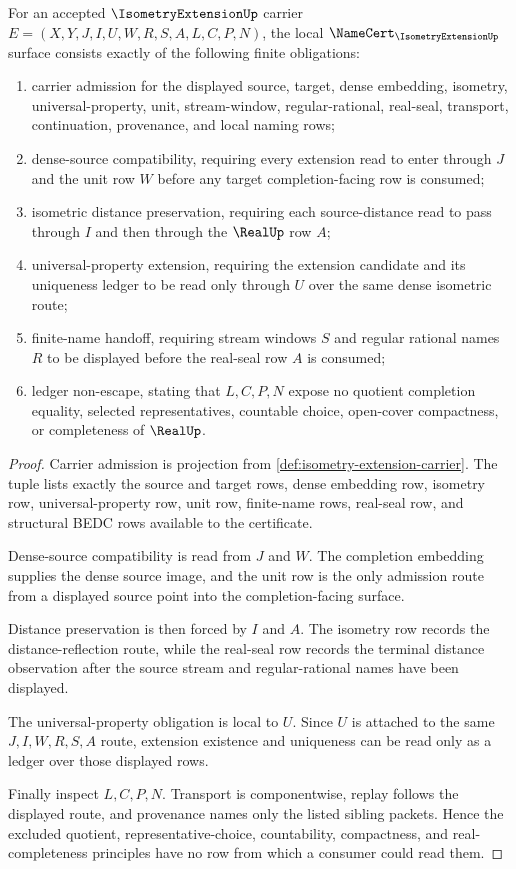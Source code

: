\begin{theorem}
\label{thm:isometry-extension-namecert-obligations}
For an accepted $\IsometryExtensionUp$ carrier $E=(X,Y,J,I,U,W,R,S,A,L,C,P,N)$, the local $\NameCert_{\IsometryExtensionUp}$ surface consists exactly of the following finite obligations:
\begin{enumerate}
\item carrier admission for the displayed source, target, dense embedding, isometry, universal-property, unit, stream-window, regular-rational, real-seal, transport, continuation, provenance, and local naming rows;
\item dense-source compatibility, requiring every extension read to enter through $J$ and the unit row $W$ before any target completion-facing row is consumed;
\item isometric distance preservation, requiring each source-distance read to pass through $I$ and then through the $\RealUp$ row $A$;
\item universal-property extension, requiring the extension candidate and its uniqueness ledger to be read only through $U$ over the same dense isometric route;
\item finite-name handoff, requiring stream windows $S$ and regular rational names $R$ to be displayed before the real-seal row $A$ is consumed;
\item ledger non-escape, stating that $L,C,P,N$ expose no quotient completion equality, selected representatives, countable choice, open-cover compactness, or completeness of $\RealUp$.
\end{enumerate}
\end{theorem}
\begin{proof}
Carrier admission is projection from \autoref{def:isometry-extension-carrier}. The tuple lists exactly the source and target rows, dense embedding row, isometry row, universal-property row, unit row, finite-name rows, real-seal row, and structural BEDC rows available to the certificate.

Dense-source compatibility is read from $J$ and $W$. The completion embedding supplies the dense source image, and the unit row is the only admission route from a displayed source point into the completion-facing surface.

Distance preservation is then forced by $I$ and $A$. The isometry row records the distance-reflection route, while the real-seal row records the terminal distance observation after the source stream and regular-rational names have been displayed.

The universal-property obligation is local to $U$. Since $U$ is attached to the same $J,I,W,R,S,A$ route, extension existence and uniqueness can be read only as a ledger over those displayed rows.

Finally inspect $L,C,P,N$. Transport is componentwise, replay follows the displayed route, and provenance names only the listed sibling packets. Hence the excluded quotient, representative-choice, countability, compactness, and real-completeness principles have no row from which a consumer could read them.
\end{proof}

